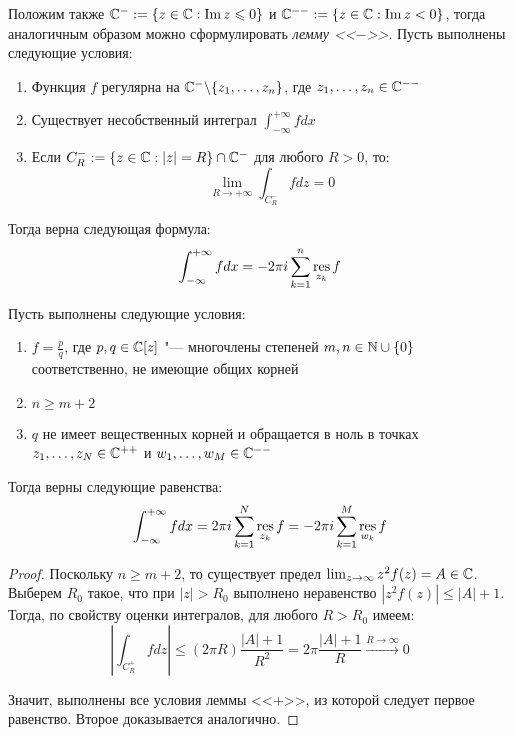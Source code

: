 \begin{note}
	Положим также $\mathbb{C}^- := \{z \in \mathbb{C}: \operatorname{Im} z \leqslant 0\}$ и $\mathbb{C}^{--} := \{z \in \mathbb{C}: \operatorname{Im} z < 0\}$, тогда аналогичным образом можно сформулировать \textit{лемму <<$-$>>}. Пусть выполнены следующие условия:
	\begin{enumerate}
		\item Функция $f$ регулярна на $\mathbb{C}^- \backslash \{z_1, \dotsc, z_n\}$, где $z_1, \dotsc, z_n \in \mathbb{C}^{--}$
		\item Существует несобственный интеграл $\int_{-\infty}^{+\infty}fdx$
		\item Если $C_R^- := \{z \in \mathbb{C}: |z| = R\} \cap \mathbb{C}^-$ для любого $R > 0$, то:
		\[\lim_{R\to +\infty} \int_{C_R^-}fdz = 0\]
	\end{enumerate}
	
	Тогда верна следующая формула:
	\[\int_{-\infty}^{+\infty}fdx = -2\pi i\sum_{k = 1}^n\operatorname*{res}_{z_k}{f}\]
\end{note}

\begin{theorem}
	Пусть выполнены следующие условия:
	\begin{enumerate}
		\item $f = \frac pq$, где $p, q \in \mathbb{C}[z]$ "--- многочлены степеней $m, n \in \mathbb{N} \cup \{0\}$ соответственно, не имеющие общих корней
		\item $n \ge m + 2$
		\item $q$ не имеет вещественных корней и обращается в ноль в точках $z_1, \dotsc, z_N \in \mathbb{C}^{++}$ и $w_1, \dotsc, w_M \in \mathbb{C}^{--}$
	\end{enumerate}
	
	Тогда верны следующие равенства:
	\[\int_{-\infty}^{+\infty}fdx = 2\pi i\sum_{k=1}^N \operatorname*{res}_{z_k}f = -2\pi i\sum_{k=1}^M \operatorname*{res}_{w_k}f\]
\end{theorem}

\begin{proof}
	Поскольку $n \ge m + 2$, то существует предел $\lim_{z \to \infty}z^2f(z) = A \in \mathbb{C}$. Выберем $R_0$ такое, что при $|z| > R_0$ выполнено неравенство $|z^2f(z)| \le |A| + 1$. Тогда, по свойству оценки интегралов, для любого $R > R_0$ имеем:
	\[\left|\int_{C_R^+}fdz\right| \le (2\pi R)\frac{|A| + 1}{R^2} = 2\pi\frac{|A| + 1}{R} \xrightarrow{R \to \infty} 0\]
	
	Значит, выполнены все условия леммы <<$+$>>, из которой следует первое равенство. Второе доказывается аналогично.
\end{proof}

